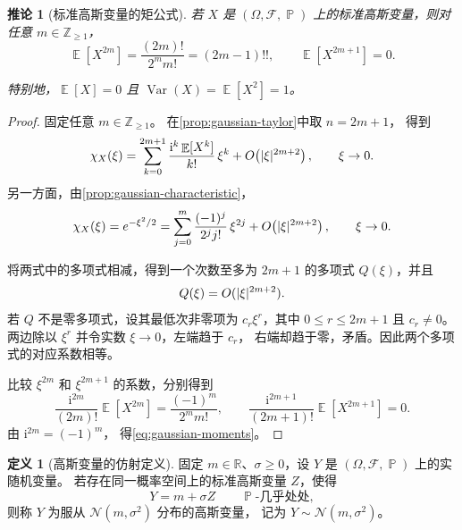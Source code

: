 \documentclass[UTF8,11pt,a4paper,oneside,fontset=fandol]{ctexrep}
\numberwithin{equation}{section}
\theoremstyle{plain}
\newtheorem{corollary}[theorem]{推论}
\theoremstyle{definition}
\newtheorem{definition}[theorem]{定义}
\theoremstyle{remark}
\newcommand{\Z}{\mathbb{Z}}
\newcommand{\R}{\mathbb{R}}
\newcommand{\F}{\mathcal{F}}
\DeclareMathOperator{\Prob}{\mathbb{P}}
\DeclareMathOperator{\E}{\mathbb{E}}
\DeclareMathOperator{\Var}{Var}
\DeclarePairedDelimiter{\abs}{\lvert}{\rvert}
\begin{document}
\begin{corollary}[标准高斯变量的矩公式]
\label{cor:gaussian-moments}
若 $X$ 是 $(\Omega,\F,\Prob)$ 上的标准高斯变量，则对任意 $m\in\Z_{\ge1}$，
\begin{equation}
  \label{eq:gaussian-moments}
  \E[X^{2m}]=\frac{(2m)!}{2^m m!}=(2m-1)!!,
  \qquad
  \E[X^{2m+1}]=0.
\end{equation}

特别地，$\E[X]=0$ 且 $\Var(X)=\E[X^2]=1$。
\end{corollary}

\begin{proof}
固定任意 $m\in\Z_{\ge1}$。
在\cref{prop:gaussian-taylor}中取 $n=2m+1$，
得到
\[
  \chi_X(\xi)
  =\sum_{k=0}^{2m+1}
     \frac{\mathrm{i}^k\E[X^k]}{k!}\,\xi^k
   +O\!\left(\abs{\xi}^{2m+2}\right),
  \qquad \xi\to0.
\]
另一方面，由\cref{prop:gaussian-characteristic}，
\[
  \chi_X(\xi)
  =e^{-\xi^2/2}
  =\sum_{j=0}^{m}\frac{(-1)^j}{2^j j!}\,\xi^{2j}
   +O\!\left(\abs{\xi}^{2m+2}\right),
  \qquad \xi\to0.
\]

将两式中的多项式相减，得到一个次数至多为
$2m+1$ 的多项式 $Q(\xi)$，并且
\[Q(\xi)=O(\abs{\xi}^{2m+2}).\]
若 $Q$ 不是零多项式，设其最低次非零项为 $c_r\xi^r$，其中
$0\le r\le2m+1$ 且 $c_r\ne0$。
两边除以 $\xi^r$ 并令实数 $\xi\to0$，左端趋于 $c_r$，
右端却趋于零，矛盾。因此两个多项式的对应系数相等。

比较 $\xi^{2m}$ 和 $\xi^{2m+1}$ 的系数，分别得到
\[
  \frac{\mathrm{i}^{2m}}{(2m)!}\E[X^{2m}]
  =\frac{(-1)^m}{2^m m!},
  \qquad
  \frac{\mathrm{i}^{2m+1}}{(2m+1)!}\E[X^{2m+1}]=0.
\]
由 $\mathrm{i}^{2m}=(-1)^m$，
得\cref{eq:gaussian-moments}。
\end{proof}

\begin{definition}[高斯变量的仿射定义]
\label{def:gaussian-affine}
固定 $m\in\R$、$\sigma\ge0$，设 $Y$ 是 $(\Omega,\F,\Prob)$ 上的实随机变量。
若存在同一概率空间上的标准高斯变量 $Z$，使得
\[
  Y=m+\sigma Z\qquad\Prob\text{-几乎处处},
\]
则称 $Y$ 为服从 $\mathcal{N}(m,\sigma^2)$ 分布的高斯变量，
记为 $Y\sim\mathcal{N}(m,\sigma^2)$。
\end{definition}
\end{document}
